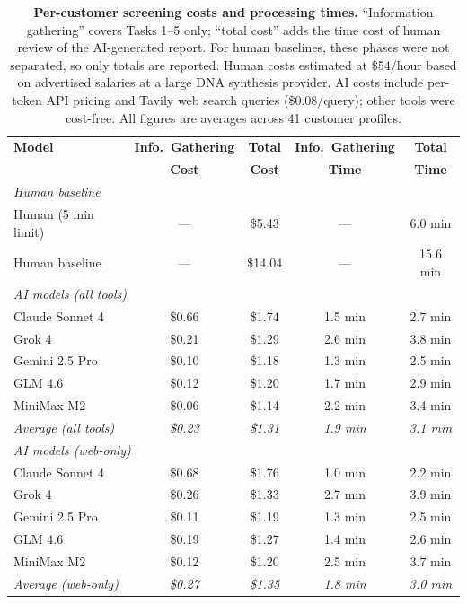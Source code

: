 \documentclass[12pt]{article}
\begin{document}
\begin{table}[H]
\centering
\caption{\textbf{Per-customer screening costs and processing times.} ``Information gathering'' covers Tasks 1--5 only; ``total cost'' adds the time cost of human review of the AI-generated report. For human baselines, these phases were not separated, so only totals are reported. Human costs estimated at \$54/hour based on advertised salaries at a large DNA synthesis provider. AI costs include per-token API pricing and Tavily web search queries (\$0.08/query); other tools were cost-free. All figures are averages across 41 customer profiles.}
\label{tab:costs}
\small
\begin{tabular}{lcccc}
\toprule
\textbf{Model} & \textbf{Info.\ Gathering} & \textbf{Total} & \textbf{Info.\ Gathering} & \textbf{Total} \\
 & \textbf{Cost} & \textbf{Cost} & \textbf{Time} & \textbf{Time} \\
\midrule
\multicolumn{5}{l}{\textit{Human baseline}} \\
Human (5 min limit) & — & \$5.43 & — & 6.0 min \\
Human baseline & — & \$14.04 & — & 15.6 min \\
\midrule
\multicolumn{5}{l}{\textit{AI models (all tools)}} \\
Claude Sonnet 4 & \$0.66 & \$1.74 & 1.5 min & 2.7 min \\
Grok 4 & \$0.21 & \$1.29 & 2.6 min & 3.8 min \\
Gemini 2.5 Pro & \$0.10 & \$1.18 & 1.3 min & 2.5 min \\
GLM 4.6 & \$0.12 & \$1.20 & 1.7 min & 2.9 min \\
MiniMax M2 & \$0.06 & \$1.14 & 2.2 min & 3.4 min \\
\textit{Average (all tools)} & \textit{\$0.23} & \textit{\$1.31} & \textit{1.9 min} & \textit{3.1 min} \\
\midrule
\multicolumn{5}{l}{\textit{AI models (web-only)}} \\
Claude Sonnet 4 & \$0.68 & \$1.76 & 1.0 min & 2.2 min \\
Grok 4 & \$0.26 & \$1.33 & 2.7 min & 3.9 min \\
Gemini 2.5 Pro & \$0.11 & \$1.19 & 1.3 min & 2.5 min \\
GLM 4.6 & \$0.19 & \$1.27 & 1.4 min & 2.6 min \\
MiniMax M2 & \$0.12 & \$1.20 & 2.5 min & 3.7 min \\
\textit{Average (web-only)} & \textit{\$0.27} & \textit{\$1.35} & \textit{1.8 min} & \textit{3.0 min} \\
\bottomrule
\end{tabular}
\end{table}
\end{document}
